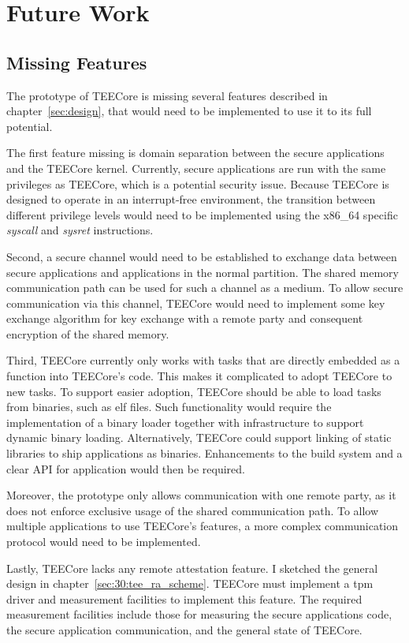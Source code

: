 \chapter{Future Work}
\label{sec:futurework}

\section{Missing Features}
The prototype of TEECore is missing several features described in
chapter~\ref{sec:design}, that would need to be implemented to use it to its
full potential.

The first feature missing is domain separation between the secure applications
and the TEECore kernel. Currently, secure applications are run with the same
privileges as TEECore, which is a potential security issue. Because TEECore is
designed to operate in an interrupt-free environment, the transition between
different privilege levels would need to be implemented using the x86\_64
specific \textit{syscall} and \textit{sysret} instructions.

Second, a secure channel would need to be established to exchange data between
secure applications and applications in the normal partition. The shared memory
communication path can be used for such a channel as a medium. To allow secure
communication via this channel, TEECore would need to implement some key
exchange algorithm for key exchange with a remote party and consequent
encryption of the shared memory.

Third, TEECore currently only works with tasks that are directly embedded as a
function into TEECore's code. This makes it complicated to adopt TEECore to new
tasks. To support easier adoption, TEECore should be able to load tasks from
binaries, such as \gls{elf} files. Such functionality would require the
implementation of a binary loader together with infrastructure to support
dynamic binary loading. Alternatively, TEECore could support linking of static
libraries to ship applications as binaries. Enhancements to the build system
and a clear API for application would then be required.

Moreover, the prototype only allows communication with one remote party, as it
does not enforce exclusive usage of the shared communication path. To allow
multiple applications to use TEECore's features, a more complex communication
protocol would need to be implemented.

Lastly, TEECore lacks any remote attestation feature. I sketched the general
design in chapter~\ref{sec:30:tee_ra_scheme}. TEECore must implement a \gls{tpm}
driver and measurement facilities to implement this feature. The required
measurement facilities include those for measuring the secure applications code,
the secure application communication, and the general state of TEECore.

